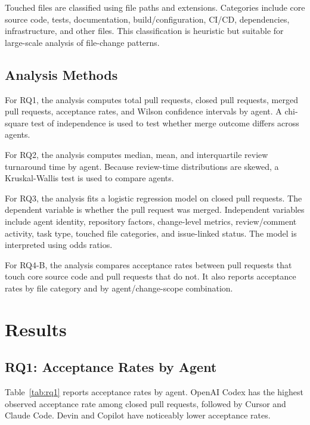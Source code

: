 \documentclass[sigconf,nonacm]{acmart}
\begin{document}
Touched files are classified using file paths and extensions. Categories include core source code, tests, documentation, build/configuration, CI/CD, dependencies, infrastructure, and other files. This classification is heuristic but suitable for large-scale analysis of file-change patterns.

\subsection{Analysis Methods}

For RQ1, the analysis computes total pull requests, closed pull requests, merged pull requests, acceptance rates, and Wilson confidence intervals by agent. A chi-square test of independence is used to test whether merge outcome differs across agents.

For RQ2, the analysis computes median, mean, and interquartile review turnaround time by agent. Because review-time distributions are skewed, a Kruskal-Wallis test is used to compare agents.

For RQ3, the analysis fits a logistic regression model on closed pull requests. The dependent variable is whether the pull request was merged. Independent variables include agent identity, repository factors, change-level metrics, review/comment activity, task type, touched file categories, and issue-linked status. The model is interpreted using odds ratios.

For RQ4-B, the analysis compares acceptance rates between pull requests that touch core source code and pull requests that do not. It also reports acceptance rates by file category and by agent/change-scope combination.

\section{Results}

\subsection{RQ1: Acceptance Rates by Agent}

Table~\ref{tab:rq1} reports acceptance rates by agent. OpenAI Codex has the highest observed acceptance rate among closed pull requests, followed by Cursor and Claude Code. Devin and Copilot have noticeably lower acceptance rates.
\end{document}
